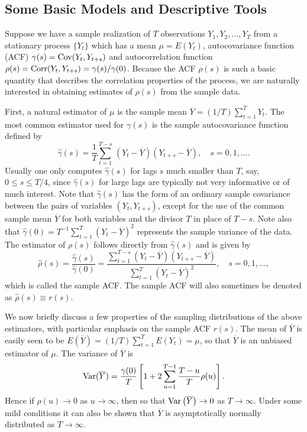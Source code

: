 \subsection{Some Basic Models and Descriptive Tools} 


Suppose we have a sample realization of $T$ observations $Y_1, Y_2, \ldots, Y_T$ from a stationary process $\{Y_t\}$ which has a mean $\mu=E(Y_t)$, autocovariance function (ACF) $\gamma(s)= \operatorname{Cov}(Y_t,Y_{t+s})$ and autocorrelation function $\rho(s)= \operatorname{Corr}(Y_t,Y_{t+s}) = \gamma(s)/\gamma(0)$. Because the ACF $\rho(s)$ is such a basic quantity that describes the correlation properties of the process, we are naturally interested in obtaining estimates of $\rho(s)$ from the sample data.


First, a natural estimator of $\mu$ is the sample mean $\overline{Y}= (1/T) \sum_{t=1}^T Y_t$. The most common estimator used for $\gamma(s)$ is the sample autocovariance function defined by
	\[
	\hat{\gamma}(s)= \frac{1}{T} \sum_{t=1}^{T-s} \, \left(Y_{t}-\overline{Y}\right) \left(Y_{t+s}-\overline{Y}\right), \quad s=0, 1, \ldots.
	\]
Usually one only computes $\hat{\gamma}(s)$ for lags $s$ much smaller than $T$, say, $0 \leq s \leq T/4$, since $\hat{\gamma}(s)$ for large lags are typically not very informative or of much interest. Note that $\hat{\gamma}(s)$ has the form of an ordinary sample covariance between the pairs of variables $(Y_t, Y_{t+s})$, except for the use of the common sample mean $\overline{Y}$ for both variables and the divisor $T$ in place of $T-s$.  Note also that $\hat{\gamma}(0) = T^{-1}\sum_{t=1}^T (Y_t-\overline{Y})^2$ represents the sample variance of the data.  The estimator of $\rho(s)$ follows directly from $\hat{\gamma}(s)$ and is given by
	\begin{equation} \label{eqn:hatrho}
         \hat{\rho}(s)= \frac{\hat{\gamma}(s)}{\hat{\gamma}(0)}= \frac{\sum_{t=1}^{T-s} \left(Y_{t}-\overline{Y}\right) \left(Y_{t+s}-\overline{Y}\right)}{\sum_{t=1}^T(Y_t-\overline{Y})^2} , \quad s= 0, 1, \ldots,
	\end{equation}
which is called the sample ACF.  The sample ACF will also sometimes be denoted as $\hat{\rho}(s) \equiv r(s)$.


We now briefly discuss a few properties of the sampling distributions of the above estimators, with particular emphasis on the sample ACF $r(s)$.  The mean of $\overline{Y}$ is easily seen to be $E(\overline{Y})= (1/T) \sum_{t=1}^T E(Y_t) = \mu$, so that $\overline{Y}$ is an unbiased estimator of $\mu$.  The variance of $\overline{Y}$ is
	\begin{equation} \label{eqn:var}
        \var(\overline{Y})= \frac{\gamma(0)}{T} \left[ 1 + 2 \sum_{u=1}^{T-1} \frac{T - u}{T} \rho(u) \right].
        \end{equation}
Hence if $\rho(u) \rightarrow 0$ as $u \rightarrow \infty$, then so that $\operatorname{Var}\left(\overline{Y}\right) \rightarrow 0$ as $T \rightarrow \infty$. Under some mild conditions it can also be shown that $\overline{Y}$ is asymptotically normally distributed as $T \rightarrow \infty$.


